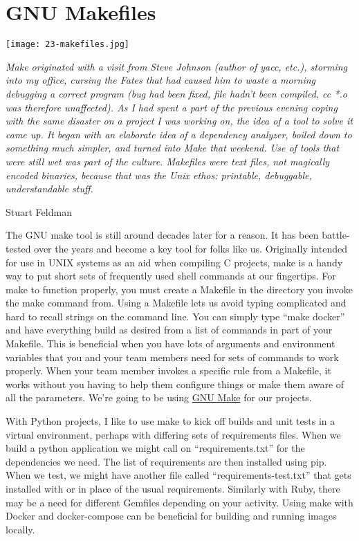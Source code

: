 \chapter{GNU Makefiles}

\texttt{[image: 23-makefiles.jpg]}

\begin{displayquote}
	\emph{Make originated with a visit from Steve Johnson (author of yacc, etc.), storming into my office, cursing the Fates that had caused him to waste a morning debugging a correct program (bug had been fixed, file hadn't been compiled, cc *.o was therefore unaffected). As I had spent a part of the previous evening coping with the same disaster on a project I was working on, the idea of a tool to solve it came up. It began with an elaborate idea of a dependency analyzer, boiled down to something much simpler, and turned into Make that weekend. Use of tools that were still wet was part of the culture. Makefiles were text files, not magically encoded binaries, because that was the Unix ethos: printable, debuggable, understandable stuff.}

	Stuart Feldman \cite{raymond2004programming}
\end{displayquote}

\justifying
The GNU make tool is still around decades later for a reason. It has been battle-tested over the years and become a key tool for folks like us.
Originally intended for use in UNIX systems as an aid when compiling C projects, make is a handy way to put short sets of frequently used shell
commands at our fingertips. For make to function properly, you must create a Makefile in the directory
you invoke the make command from. Using a Makefile lets us avoid typing complicated and hard to recall strings on the command
line. You can simply type ``make docker'' and have everything build as desired from a list of commands in part of your Makefile. This is beneficial when
you have lots of arguments and environment variables that you and your team members need for sets of commands
to work properly. When your team member invokes a specific rule from a Makefile, it works without you having to
help them configure things or make them aware of all the parameters. We're going to be using \href{https://www.gnu.org/software/make/}{GNU Make} for our projects.

\justifying
With Python projects, I like to use make to kick off builds and unit tests in a virtual environment, perhaps with differing sets of requirements files. When we build a
python application we might call on ``requirements.txt'' for the dependencies we need. The list of requirements are then installed using pip. When we test, we might have
another file called ``requirements-test.txt'' that gets installed with or in place of the usual requirements. Similarly with Ruby, there may be a need for different Gemfiles
depending on your activity. Using make with Docker and docker-compose can be beneficial for building and running images locally.

